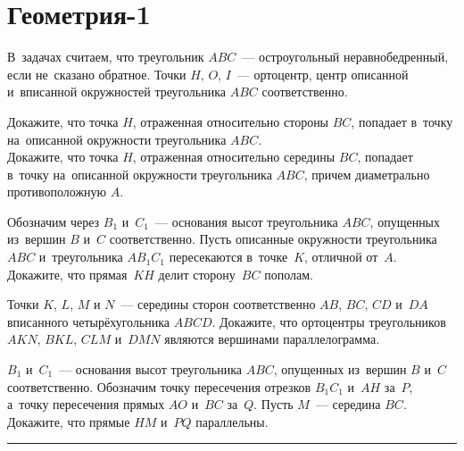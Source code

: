 
\section*{Геометрия-1}



В~задачах считаем, что треугольник $ABC$~--- остроугольный неравнобедренный,
если не~сказано обратное.
Точки $H$, $O$, $I$~--- ортоцентр, центр описанной и~вписанной окружностей
треугольника $ABC$ соответственно.

\begin{problems}

\item
\sp
Докажите, что точка $H$, отраженная относительно стороны $BC$, попадает в~точку
на~описанной окружности треугольника $ABC$.
\\
\sp
Докажите, что точка $H$, отраженная относительно середины $BC$, попадает
в~точку на~описанной окружности треугольника $ABC$, причем диаметрально
противоположную $A$.

\item
Обозначим через $B_1$ и~$C_1$~--- основания высот треугольника $ABC$, опущенных
из~вершин $B$ и~$C$ соответственно.
Пусть описанные окружности треугольника $ABC$ и~треугольника $A B_1 C_1$
пересекаются в~точке~$K$, отличной от~$A$.
Докажите, что прямая~$KH$ делит сторону~$BC$ пополам.

\item
Точки $K$, $L$, $M$ и $N$~--- середины сторон соответственно
$AB$, $BC$, $CD$ и~$DA$ вписанного четырёхугольника $ABCD$.
Докажите, что ортоцентры треугольников $AKN$, $BKL$, $CLM$ и~$DMN$ являются
вершинами параллелограмма.

\item
$B_1$ и~$C_1$~--- основания высот треугольника $ABC$, опущенных из~вершин $B$
и~$C$ соответственно.
Обозначим точку пересечения отрезков $B_1 C_1$ и~$AH$ за~$P$, а~точку
пересечения прямых $AO$ и~$BC$ за~$Q$.
Пусть $M$~--- середина $BC$.
Докажите, что прямые $HM$ и~$PQ$ параллельны.

\end{problems}

\rule[0.5ex]{\textwidth}{0.5pt}

